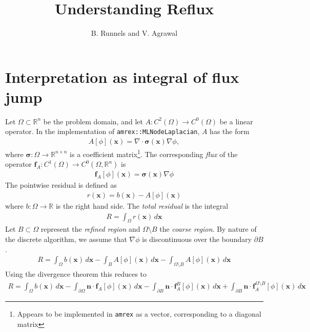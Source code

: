 \documentclass{article}
\title{Understanding Reflux}
\author{B. Runnels and V. Agrawal}
\begin{document}
\maketitle
\setlength\parindent{0pt}
\def\flux{\operatorname{Flux}}
\def\Int{\operatorname{int}}


\section{Interpretation as integral of flux jump}
Let $\Omega\subset\mathbb{R}^n$ be the problem domain, and let $A:C^2(\Omega)\to C^0(\Omega)$ be a linear operator.
In the implementation of \texttt{amrex::MLNodeLaplacian}, $A$ has the form
\begin{align}
  A[\phi](\bm{x}) = \nabla\cdot\bm{\sigma}(\bm{x})\nabla\phi, 
\end{align}
where $\bm{\sigma}:\Omega\to\mathbb{R}^{n\times n}$ is a coefficient matrix\footnote{Appears to be implemented in \texttt{amrex} as a vector, corresponding to a diagonal matrix}.
The corresponding {\it flux} of the operator $\bm{f}_A:C^1(\Omega)\to C^0(\Omega,\mathbb{R}^n)$ is
\begin{align}
  \bm{f}_A[\phi](\bm{x}) = \bm{\sigma}(\bm{x})\nabla\phi
\end{align}
The pointwise residual is defined as 
\begin{align}
  r(\bm{x}) = b(\bm{x}) - A[\phi](\bm{x})
\end{align}
where $b:\Omega\to\mathbb{R}$ is the right hand side.
The {\it total residual} is the integral 
\begin{align}
  R = \int_\Omega r(\bm{x})\,d\bm{x}
\end{align}
Let $B\subset\Omega$ represent the {\it refined region} and $\Omega\setminus B$ the {\it coarse region}.
By nature of the discrete algorithm, we assume that $\nabla\phi$ is discontinuous over the boundary $\partial B$.
\begin{align}\label{eq:resorig}
  R = \int_\Omega b(\bm{x})\,d\bm{x} - \int_{B} A[\phi](\bm{x})\,d\bm{x} - \int_{\Omega\setminus B} A[\phi](\bm{x})\,d\bm{x}
\end{align}
Using the divergence theorem this reduces to
\begin{align}
  R = \int_\Omega b(\bm{x})\,d\bm{x} - \int_{\partial \Omega} \bm{n}\cdot\bm{f}_A[\phi](\bm{x})\,d\bm{x} - \int_{\partial B} \bm{n}\cdot\bm{f}^{B}_A[\phi](\bm{x})\,d\bm{x} + \int_{\partial B} \bm{n}\cdot\bm{f}^{\Omega\setminus B}_A[\phi](\bm{x})\,d\bm{x}
\end{align}
\end{document}
